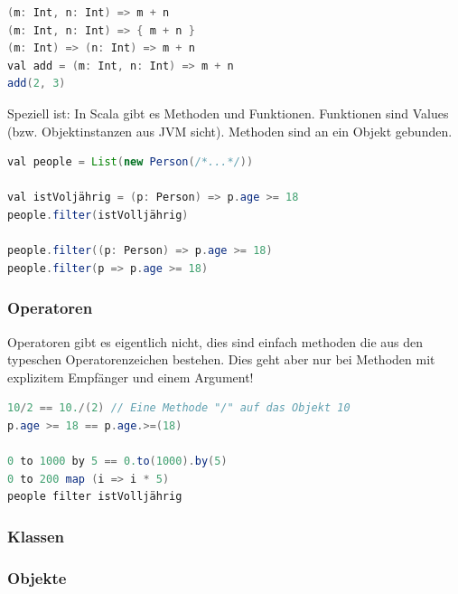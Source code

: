 \begin{lstlisting}[language=java]
(m: Int, n: Int) => m + n
(m: Int, n: Int) => { m + n }
(m: Int) => (n: Int) => m + n
val add = (m: Int, n: Int) => m + n
add(2, 3)
\end{lstlisting}

Speziell ist: In Scala gibt es Methoden und Funktionen. Funktionen sind Values (bzw. Objektinstanzen aus JVM sicht). Methoden sind an ein Objekt gebunden.


\begin{lstlisting}[language=java]
val people = List(new Person(/*...*/))

val istVoljährig = (p: Person) => p.age >= 18
people.filter(istVolljährig)

people.filter((p: Person) => p.age >= 18)
people.filter(p => p.age >= 18)
\end{lstlisting}


\subsubsection{Operatoren}
Operatoren gibt es eigentlich nicht, dies sind einfach methoden die aus den typeschen Operatorenzeichen bestehen. Dies geht aber nur bei Methoden mit explizitem Empfänger und einem Argument!

\begin{lstlisting}[language=java]
10/2 == 10./(2) // Eine Methode "/" auf das Objekt 10
p.age >= 18 == p.age.>=(18)

0 to 1000 by 5 == 0.to(1000).by(5)
0 to 200 map (i => i * 5)
people filter istVolljährig
\end{lstlisting}

\subsubsection{Klassen}

\subsubsection{Objekte}





